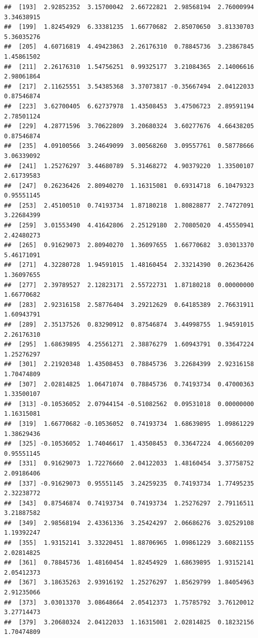 \documentclass[
]{article}
\begin{document}
\begin{verbatim}
##  [193]  2.92852352  3.15700042  2.66722821  2.98568194  2.76000994  3.34638915
##  [199]  1.82454929  6.33381235  1.66770682  2.85070650  3.81330703  5.36035276
##  [205]  4.60716819  4.49423863  2.26176310  0.78845736  3.23867845  1.45861502
##  [211]  2.26176310  1.54756251  0.99325177  3.21084365  2.14006616  2.98061864
##  [217]  2.11625551  3.54385368  3.37073817 -0.35667494  2.04122033  0.87546874
##  [223]  3.62700405  6.62737978  1.43508453  3.47506723  2.89591194  2.78501124
##  [229]  4.28771596  3.70622809  3.20680324  3.60277676  4.66438205  0.87546874
##  [235]  4.09100566  3.24649099  3.00568260  3.09557761  0.58778666  3.06339092
##  [241]  1.25276297  3.44680789  5.31468272  4.90379220  1.33500107  2.61739583
##  [247]  0.26236426  2.80940270  1.16315081  0.69314718  6.10479323  0.95551145
##  [253]  2.45100510  0.74193734  1.87180218  1.80828877  2.74727091  3.22684399
##  [259]  3.01553490  4.41642806  2.25129180  2.70805020  4.45550941  2.42480273
##  [265]  0.91629073  2.80940270  1.36097655  1.66770682  3.03013370  5.46171091
##  [271]  4.32280728  1.94591015  1.48160454  2.33214390  0.26236426  1.36097655
##  [277]  2.39789527  2.12823171  2.55722731  1.87180218  0.00000000  1.66770682
##  [283]  2.92316158  2.58776404  3.29212629  0.64185389  2.76631911  1.60943791
##  [289]  2.35137526  0.83290912  0.87546874  3.44998755  1.94591015  2.26176310
##  [295]  1.68639895  4.25561271  2.38876279  1.60943791  0.33647224  1.25276297
##  [301]  2.21920348  1.43508453  0.78845736  3.22684399  2.92316158  1.70474809
##  [307]  2.02814825  1.06471074  0.78845736  0.74193734  0.47000363  1.33500107
##  [313] -0.10536052  2.07944154 -0.51082562  0.09531018  0.00000000  1.16315081
##  [319]  1.66770682 -0.10536052  0.74193734  1.68639895  1.09861229  1.38629436
##  [325] -0.10536052  1.74046617  1.43508453  0.33647224  4.06560209  0.95551145
##  [331]  0.91629073  1.72276660  2.04122033  1.48160454  3.37758752  2.09186406
##  [337] -0.91629073  0.95551145  3.24259235  0.74193734  1.77495235  2.32238772
##  [343]  0.87546874  0.74193734  0.74193734  1.25276297  2.79116511  3.21887582
##  [349]  2.98568194  2.43361336  3.25424297  2.06686276  3.02529108  1.19392247
##  [355]  1.93152141  3.33220451  1.88706965  1.09861229  3.60821155  2.02814825
##  [361]  0.78845736  1.48160454  1.82454929  1.68639895  1.93152141  2.05412373
##  [367]  3.18635263  2.93916192  1.25276297  1.85629799  1.84054963  2.91235066
##  [373]  3.03013370  3.08648664  2.05412373  1.75785792  3.76120012  3.27714473
##  [379]  3.20680324  2.04122033  1.16315081  2.02814825  0.18232156  1.70474809

\end{verbatim}
\end{document}
